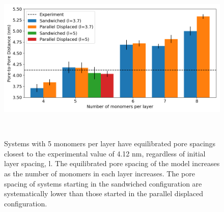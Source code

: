 \documentclass{article}
\begin{document}
  \begin{figure}
	\centering
	\includegraphics[width=\linewidth]{p2p.png}
	\caption{Systems with 5 monomers per layer have equilibrated pore spacings closest to
			 the experimental value of 4.12 nm, regardless of initial layer spacing, l. The 
			 equilibrated pore spacing of the model increases as the number of monomers 
			 in each layer increases. The pore spacing of systems starting in the sandwiched 	
			 configuration are systematically lower than those started in the parallel 
			 displaced configuration.}~\label{fig:p2p}
  \end{figure}

\end{document}
